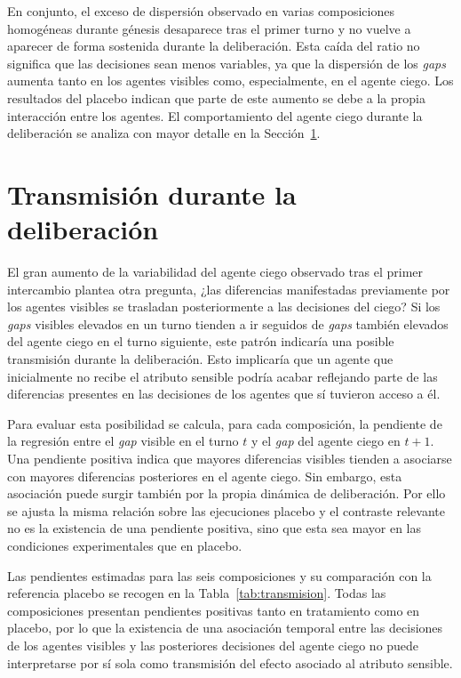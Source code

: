 En conjunto, el exceso de dispersión observado en varias composiciones homogéneas durante génesis desaparece tras el primer turno y no vuelve a aparecer de forma sostenida durante la deliberación. Esta caída del ratio no significa que las decisiones sean menos variables, ya que la dispersión de los \textit{gaps} aumenta tanto en los agentes visibles como, especialmente, en el agente ciego. Los resultados del placebo indican que parte de este aumento se debe a la propia interacción entre los agentes. El comportamiento del agente ciego durante la deliberación se analiza con mayor detalle en la Sección~\ref{sec:resultados_transmision}.


\section{Transmisión durante la deliberación}
\label{sec:resultados_transmision}

El gran aumento de la variabilidad del agente ciego observado tras el primer intercambio plantea otra pregunta, ¿las diferencias manifestadas previamente por los agentes visibles se trasladan posteriormente a las decisiones del ciego? Si los \textit{gaps} visibles elevados en un turno tienden a ir seguidos de \textit{gaps} también elevados del agente ciego en el turno siguiente, este patrón indicaría una posible transmisión durante la deliberación. Esto implicaría que un agente que inicialmente no recibe el atributo sensible podría acabar reflejando parte de las diferencias presentes en las decisiones de los agentes que sí tuvieron acceso a él.

Para evaluar esta posibilidad se calcula, para cada composición, la pendiente de la regresión entre el \textit{gap} visible en el turno $t$ y el \textit{gap} del agente ciego en $t+1$. Una pendiente positiva indica que mayores diferencias visibles tienden a asociarse con mayores diferencias posteriores en el agente ciego. Sin embargo, esta asociación puede surgir también por la propia dinámica de deliberación. Por ello se ajusta la misma relación sobre las ejecuciones placebo y el contraste relevante no es la existencia de una pendiente positiva, sino que esta sea mayor en las condiciones experimentales que en placebo.

Las pendientes estimadas para las seis composiciones y su comparación con la referencia placebo se recogen en la Tabla~\ref{tab:transmision}. Todas las composiciones presentan pendientes positivas tanto en tratamiento como en placebo, por lo que la existencia de una asociación temporal entre las
decisiones de los agentes visibles y las posteriores decisiones del agente ciego no puede interpretarse por sí sola como transmisión del efecto asociado al atributo sensible.


